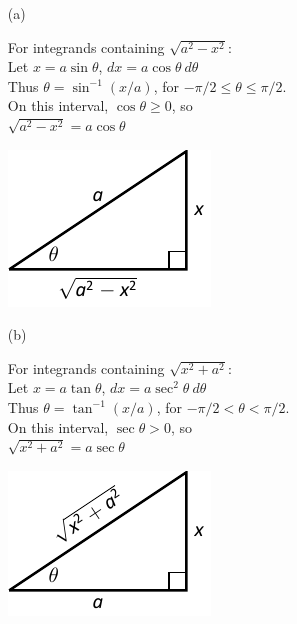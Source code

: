 \setboxwidth{100pt}
\noindent\begin{minipage}{\linewidth+100pt}
{\begin{enumerate}
	\item[(a)] \noindent%
		\begin{minipage}[t]{.6\linewidth}%
		For integrands containing $\sqrt{a^2-x^2}$:\\[5pt]
		Let $x=a\sin\theta$, \qquad $dx = a\cos\theta\ d\theta$\\[5pt]	
	Thus $\theta = \sin^{-1}(x/a)$, for $-\pi/2\leq \theta\leq \pi/2$. \\[5pt]	
	On this interval, $\cos\theta\geq 0$, so\\[5pt]	
	$\sqrt{a^2-x^2} = a\cos\theta$
		\end{minipage}\qquad
	\begin{minipage}[t]{.4\linewidth}\vskip 0pt
		\includegraphics{figures/figtrigsub_intro1}
		\end{minipage}
		
	\item[(b)] \noindent
	\begin{minipage}[t]{.6\linewidth}
		For integrands containing $\sqrt{x^2+a^2}$:\\[5pt]
		Let $x=a\tan\theta$, \qquad $dx = a\sec^2\theta\ d\theta$\\[5pt]	
	Thus $\theta = \tan^{-1}(x/a)$, for $-\pi/2 < \theta < \pi/2$. \\[5pt]	
	On this interval, $\sec\theta> 0$, so\\[5pt]	
	$\sqrt{x^2+a^2} = a\sec\theta$
		\end{minipage}\qquad
	\begin{minipage}[t]{.4\linewidth}\vskip 0pt
		\includegraphics{figures/figtrigsub_intro3}
		\end{minipage}
		

\end{enumerate}}
\end{minipage}
